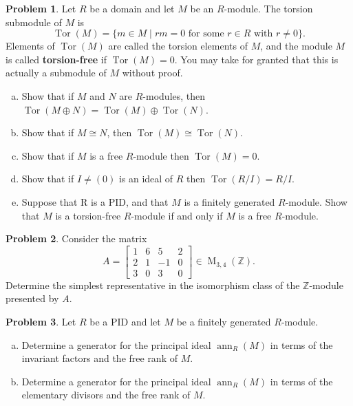 \documentclass[11pt]{article}
\DeclareMathOperator{\ann}{ann}
\DeclareMathOperator{\M}{M}
\DeclareMathOperator{\Tor}{Tor}
\newcommand{\Z}{\mathbb{Z}}
\theoremstyle{definition}
\newtheorem{problem}{Problem}
\begin{document}
\begin{problem}
Let $R$ be a domain and let $M$ be an $R$-module. The torsion submodule of $M$ is 
$$\Tor(M) = \{m \in M \mid rm = 0 \text{ for some } r \in R \textrm{ with } r \neq 0 \}.$$ 
Elements of $\Tor(M)$ are called the torsion elements of $M$, and the module $M$ is called {\bf torsion-free} if $\Tor(M) = 0$. You may take for granted that this is actually a submodule of $M$ without proof.

\begin{enumerate}[a)]
\item Show that if $M$ and $N$ are $R$-modules, then $\Tor(M \oplus N) = \Tor(M) \oplus \Tor(N)$.
\item Show that if $M \cong N$, then $\Tor(M) \cong \Tor(N)$.
\item Show that if $M$ is a free $R$-module then $\Tor(M)=0$.
\item Show that if $I\neq(0)$ is an ideal of $R$ then $\Tor(R/I)=R/I$.
\item Suppose that R is a PID, and that $M$ is a finitely generated $R$-module. Show that $M$ is a torsion-free $R$-module if and only if $M$ is a free $R$-module.
\end{enumerate} 
\end{problem}


\vfill


\begin{problem}
Consider the matrix 
$$A=\begin{bmatrix}
1 & 6 & 5 & 2 \\
2 & 1 & -1 & 0 \\
3 & 0 & 3 & 0
\end{bmatrix}
\in \M_{3,4}(\Z).$$
Determine the simplest representative in the isomorphism class of the $\Z$-module presented by $A$.
\end{problem}



\newpage 


\begin{problem}
Let $R$ be a PID and let $M$ be a finitely generated $R$-module. 
\begin{enumerate}[a)]
\item Determine a generator for the principal ideal $\ann_R(M)$ in terms of the invariant factors and the free rank of $M$.
\item Determine a generator for the principal ideal $\ann_R(M)$ in terms of the elementary divisors and the free rank of $M$.
\end{enumerate}
\end{problem}
\end{document}
